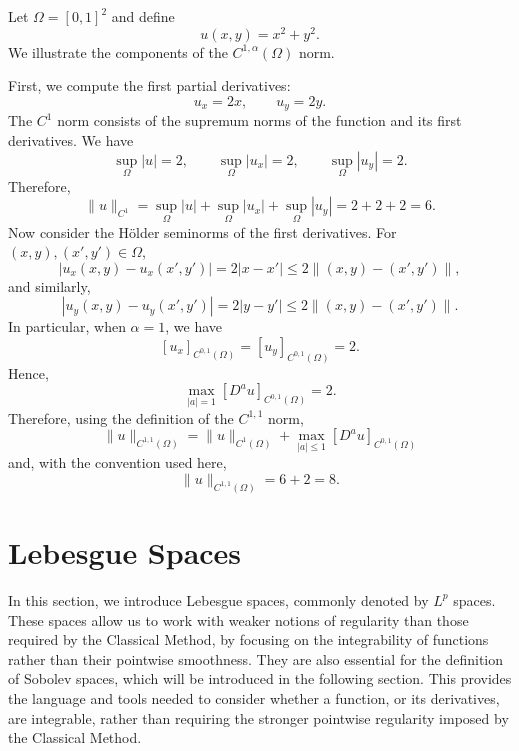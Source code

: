 \begin{example}
    \label{ex:C1alpha-norm}

    Let $\Omega=[0,1]^2$ and define
    \[
        u(x,y)=x^2+y^2.
    \]
    We illustrate the components of the $C^{1,\alpha}(\Omega)$ norm.

    First, we compute the first partial derivatives:
    \[
        u_x=2x,
        \qquad
        u_y=2y.
    \]
    The $C^1$ norm consists of the supremum norms of the function and
    its first derivatives. We have
    \[
        \sup_{\Omega}|u|=2,
        \qquad
        \sup_{\Omega}|u_x|=2,
        \qquad
        \sup_{\Omega}|u_y|=2.
    \]
    Therefore,
    \[
        \|u\|_{C^1}
        =
        \sup_{\Omega}|u|
        +
        \sup_{\Omega}|u_x|
        +
        \sup_{\Omega}|u_y|
        =
        2+2+2=6.
    \]
    Now consider the H\"older seminorms of the first derivatives. For
    $(x,y),(x',y')\in\Omega$,
    \[
        |u_x(x,y)-u_x(x',y')|
        =
        2|x-x'|
        \leq
        2\|(x,y)-(x',y')\|,
    \]
    and similarly,
    \[
        |u_y(x,y)-u_y(x',y')|
        =
        2|y-y'|
        \leq
        2\|(x,y)-(x',y')\|.
    \]
    In particular, when $\alpha=1$, we have
    \[
        [u_x]_{C^{0,1}(\Omega)}
        =
        [u_y]_{C^{0,1}(\Omega)}
        =2.
    \]
    Hence,
    \[
        \max_{|a|=1}[D^a u]_{C^{0,1}(\Omega)}
        =2.
    \]
    Therefore, using the definition of the $C^{1,1}$ norm,
    \[
        \|u\|_{C^{1,1}(\Omega)}
        =
        \|u\|_{C^1(\Omega)}
        +
        \max_{|a|\leq1}[D^a u]_{C^{0,1}(\Omega)}
    \]
    and, with the convention used here,
    \[
        \|u\|_{C^{1,1}(\Omega)}
        =
        6+2=8.
    \]
\end{example}

\section{Lebesgue Spaces}

In this section, we introduce Lebesgue spaces, commonly denoted by $L^p$ spaces. These spaces allow us to work with weaker notions of regularity than those required by the Classical Method, by focusing on the integrability of functions rather than their pointwise smoothness. They are also essential for the definition of Sobolev spaces, which will be introduced in the following section. This provides the language and tools needed to consider whether a function, or its derivatives, are integrable, rather than requiring the stronger pointwise regularity imposed by the Classical Method.

